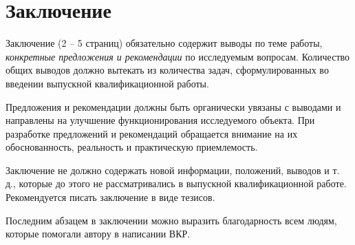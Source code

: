 \chapter*{Заключение} \label{ch-conclusion}

Заключение (2 -- 5 страниц) обязательно содержит выводы по теме работы, \textit{конкретные
предложения и рекомендации} по исследуемым вопросам. Количество общих выводов
должно вытекать из количества задач, сформулированных во введении выпускной
квалификационной работы.

Предложения и рекомендации должны быть органически увязаны с выводами
и направлены на улучшение функционирования исследуемого объекта. При разработке
предложений и рекомендаций обращается внимание на их обоснованность,
реальность и практическую приемлемость.

Заключение не должно содержать новой информации, положений, выводов и
т. д., которые до этого не рассматривались в выпускной квалификационной работе.
Рекомендуется писать заключение в виде тезисов.

Последним абзацем в заключении можно выразить благодарность всем людям, которые помогали автору в написании ВКР.